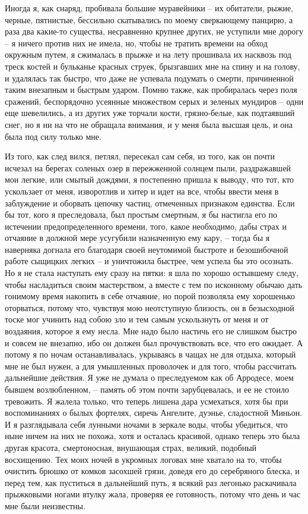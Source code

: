 Иногда я, как снаряд, пробивала большие муравейники  --  их  обитатели,
рыжие,   черные,  пятнистые,  бессильно  скатывались  по  моему  сверкающему
панцирю, а раза  два  какие-то  существа,  несравненно  крупнее  других,  не
уступили  мне  дорогу  -- я ничего против них не имела, но, чтобы не тратить
времени на обход окружным путем, я сжималась в прыжке и на лету прошивала их
насквозь под треск костей и бульканье  красных  струек,  брызгавших  мне  на
спину  и  на голову, и удалялась так быстро, что даже не успевала подумать о
смерти, причиненной таким внезапным  и  быстрым  ударом.  Помню  также,  как
пробиралась  через  поля  сражений, беспорядочно усеянные множеством серых и
зеленых мундиров -- одни еще шевелились, а  из  других  уже  торчали  кости,
грязно-белые,  как подтаявший снег, но я ни на что не обращала внимания, и у
меня была высшая цель, и она была под силу только мне.

Из того, как след вился, петлял, пересекал сам себя, из  того,  как  он
почти   исчезал   на  берегах  соленых  озер  в  пережженной  солнцем  пыли,
раздражавшей мои легкие, или смытый дождями, я постепенно пришла  к  выводу,
что  тот,  кто  ускользает  от меня, изворотлив и хитер и идет на все, чтобы
ввести меня в заблуждение и оборвать цепочку  частиц,  отмеченных  признаком
единства.  Если  бы  тот,  кого  я  преследовала, был простым смертным, я бы
настигла его по истечении предопределенного времени, того, какое необходимо,
дабы страх и отчаяние в должной мере  усугубили  назначенную  ему  кару,  --
тогда  бы  я  наверняка  догнала  его  благодаря своей неутомимой быстроте и
безошибочной работе сыщицких легких -- и уничтожила быстрее, чем  успела  бы
это  осознать.  Но  я не стала наступать ему сразу на пятки: я шла по хорошо
остывшему следу, чтобы насладиться своим мастерством,  а  вместе  с  тем  по
исконному  обычаю  дать  гонимому  время  накопить в себе отчаяние, но порой
позволяла ему хорошенько оторваться, потому что,  чувствуя  мою  неотступную
близость,  он  в  безысходной  тоске  мог  учинить над собою зло и тем самым
ускользнуть от меня и от воздаяния, которое  я  ему  несла.  Мне  надо  было
настичь  его  не  слишком  быстро  и  совсем  не внезапно, ибо он должен был
прочувствовать все, что его ожидает. А потому я  по  ночам  останавливалась,
укрываясь  в чащах не для отдыха, который мне не был нужен, а для умышленных
проволочек и для того, чтобы рассчитать дальнейшие действия. Я уже не думала
о преследуемом как об Арродесе, моем бывшем возлюбленном, -- память об  этом
почти  зарубцевалась,  и ее не стоило тревожить. Я жалела только, что теперь
лишена дара усмехаться, хотя бы при воспоминаниях о былых  фортелях,  сиречь
Ангелите,  дуэнье, сладостной Миньон. И я разглядывала себя лунными ночами в
зеркале воды, чтобы убедиться, что ныне ничем  на  них  не  похожа,  хотя  и
осталась  красивой,  однако  теперь  это  была другая красота, смертоносная,
внушающая страх, великий, подобный восхищению. Тех  моих  ночей  в  укромных
логовах  мне  хватало на то, чтобы очистить брюшко от комков засохшей грязи,
доведя его до серебряного блеска, и перед тем, как  пуститься  в  дальнейший
путь,  я  всякий  раз  легонько  раскачивала  прыжковыми ногами втулку жала,
проверяя ее готовность, потому что день и час мне были неизвестны.


